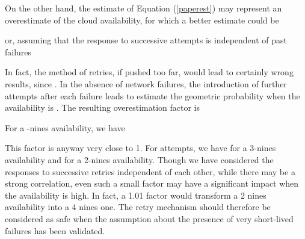 \documentclass[runningheads,a4paper]{llncs}
\begin{document}
On the other hand, the estimate of Equation (\ref{paperest}) may represent an overestimate of the cloud availability, for which a better estimate could be

or, assuming that the response to successive attempts is independent of past failures

In fact, the method of retries, if pushed too far, would lead to certainly wrong results, since . In the absence of network failures, the introduction of further attempts after each failure leads to estimate the geometric probability  when the availability is . The resulting overestimation factor is

For a -nines availability, we have

This factor is anyway very close to 1. For  attempts, we have  for a 3-nines availability and  for a 2-nines  availability. Though we have considered the responses to successive retries independent of each other, while there may be a strong correlation, even such a small factor may have a significant impact when the availability is high. In fact, a 1.01 factor would transform a 2 nines availability into a 4 nines one. The retry mechanism should therefore be considered as safe when the assumption about the presence of very short-lived failures has been validated.
\end{document}
